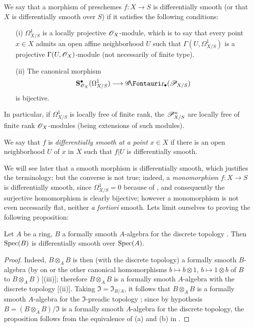 \begin{definition}[16.10.1]
\label{IV.16.10.1}
We say that a morphism of preschemes $f: X \to S$ is differentially smooth (or that $X$ is differentially smooth over $S$) if it satisfies the following conditions:
\begin{enumerate}
  \item[\rm{(i)}] $\Omega_{X/S}^1$ is a locally projective $\mathscr{O}_X$-module, which is to say that every point $x \in X$ admits an open affine neighborhood $U$ such that $\Gamma(U, \Omega_{X/S}^1)$ is a projective $\Gamma(U, \mathscr{O}_X)$-module (not necessarily of finite type).
  \item[\rm{(ii)}] The canonical morphism 
  \[
    \bb{S}_{\sh{O}_X}^\bullet(\Omega_{X/S}^1) \to \shGr_\bullet(\sh{P}_{X/S})
  \]
  is bijective.
\end{enumerate}

In particular, if $\Omega_{X/S}^1$ is locally free of finite rank, the $\mathscr{P}_{X/S}^n$ are locally free of finite rank $\mathscr{O}_X$-modules (being extensions of such modules).
\end{definition}

We say that $f$ is \emph{differentially smooth at a point $x \in X$} if there is an open neighborhood $U$ of $x$ in $X$ such that $f|U$ is differentially smooth.

We will see later  that a smooth morphism is differentially smooth, which justifies the terminology;
but the converse is not true;
indeed, a \emph{monomorphism} $f:X \to S$ is differentially smooth, since $\Omega^1_{X/S} = 0$ because of , and consequently the surjective homomorphism  is clearly bijective;
however a monomorphism is not even necessarily flat, neither \textit{a fortiori} smooth. 
Lets limit ourselves to proving the following proposition:

\begin{proposition}[16.10.2]
\label{IV.16.10.2}
Let $A$ be a ring, $B$ a formally smooth $A$-algebra for the discrete topology .
Then $\operatorname{Spec}(B)$ is differentially smooth over $\operatorname{Spec}(A)$.
\end{proposition}

\begin{proof}
Indeed, $B \otimes_A B$ is then (with the discrete topology) a formally smooth $B$-algebra (by on or the other canonical homomorphisms $b \mapsto b \otimes 1$, $b \mapsto 1 \otimes b$ of $B$
to $B \otimes_A B$
) [(iii)];
therefore $B \otimes_A B$ is a formally smooth $A$-algebra with the discrete topology [(ii)].
Taking $\mathfrak{I} = \mathfrak{I}_{B/A}$, it follows that $B \otimes_A B$ is a formally smooth $A$-algebra for the $\mathfrak{I}$-preadic topology ;
since by hypothesis $B = (B \otimes_A B)/\mathfrak{I}$ is a formally smooth $A$-algebra for the discrete topology, the proposition follows from the equivalence of (a) and (b) in .
\end{proof}


